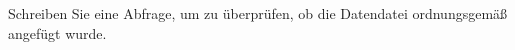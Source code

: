 \item Schreiben Sie eine Abfrage, um zu überprüfen, ob die Datendatei
ordnungsgemäß angefügt wurde.
